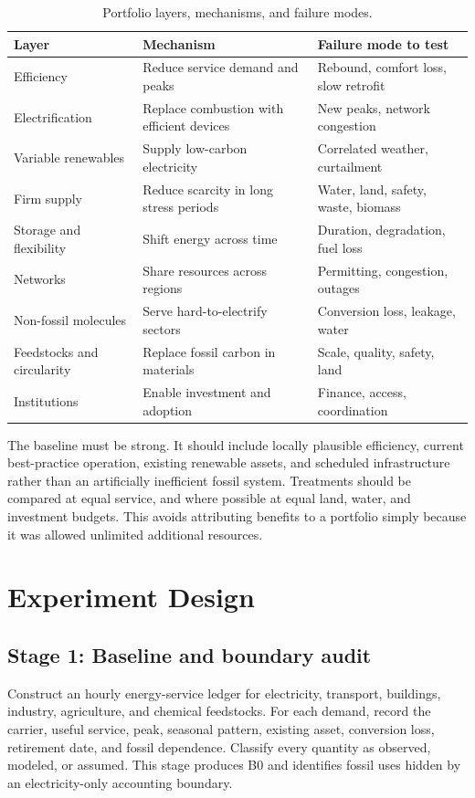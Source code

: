 \documentclass[conference]{IEEEtran}
\begin{document}
\begin{table}[t]
\centering
\caption{Portfolio layers, mechanisms, and failure modes.}
\label{tab:layers}
\scriptsize
\setlength{\tabcolsep}{2pt}
\begin{tabular}{>{\raggedright\arraybackslash}p{}>{\raggedright\arraybackslash}p{}>{\raggedright\arraybackslash}p{}}
\toprule
Layer & Mechanism & Failure mode to test\\
\midrule
Efficiency & Reduce service demand and peaks & Rebound, comfort loss, slow retrofit\\
Electrification & Replace combustion with efficient devices & New peaks, network congestion\\
Variable renewables & Supply low-carbon electricity & Correlated weather, curtailment\\
Firm supply & Reduce scarcity in long stress periods & Water, land, safety, waste, biomass\\
Storage and flexibility & Shift energy across time & Duration, degradation, fuel loss\\
Networks & Share resources across regions & Permitting, congestion, outages\\
Non-fossil molecules & Serve hard-to-electrify sectors & Conversion loss, leakage, water\\
Feedstocks and circularity & Replace fossil carbon in materials & Scale, quality, safety, land\\
Institutions & Enable investment and adoption & Finance, access, coordination\\
\bottomrule
\end{tabular}
\end{table}

The baseline must be strong. It should include locally plausible efficiency, current best-practice operation, existing renewable assets, and scheduled infrastructure rather than an artificially inefficient fossil system. Treatments should be compared at equal service, and where possible at equal land, water, and investment budgets. This avoids attributing benefits to a portfolio simply because it was allowed unlimited additional resources.

\section{Experiment Design}
\label{sec:design}
\subsection{Stage 1: Baseline and boundary audit}
Construct an hourly energy-service ledger for electricity, transport, buildings, industry, agriculture, and chemical feedstocks. For each demand, record the carrier, useful service, peak, seasonal pattern, existing asset, conversion loss, retirement date, and fossil dependence. Classify every quantity as observed, modeled, or assumed. This stage produces B0 and identifies fossil uses hidden by an electricity-only accounting boundary.
\end{document}

